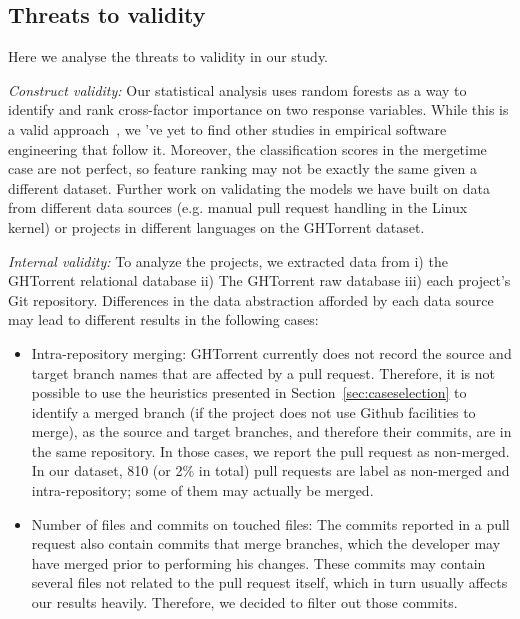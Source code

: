 \documentclass{sig-alternate}
\begin{document}
\subsection{Threats to validity}
Here we analyse the threats to validity in our study.

\noindent\emph{Construct validity:} Our statistical analysis uses random forests as a
way to identify and rank cross-factor importance on two response variables.
While this is a valid approach~\cite{}, we 've yet to find other studies in
empirical software engineering that follow it. Moreover, the classification
scores in the \textsf{mergetime} case are not perfect, so feature ranking may
not be exactly the same given a different dataset. Further work on validating
the models we have built on data from different data sources (e.g. manual pull
request handling in the Linux kernel) or projects in different languages on the
GHTorrent dataset.

\noindent\emph{Internal validity:}
To analyze the projects, we extracted data from i) the GHTorrent relational
database ii) The GHTorrent raw database iii) each project's Git repository.
Differences in the data abstraction afforded by each data source may
lead to different results in the following cases: 

\begin{itemize}

  \item Intra-repository merging: GHTorrent currently does not record the source
    and target branch names that are affected by a pull request. Therefore, it
    is not possible to use the heuristics presented in
    Section~\ref{sec:caseselection} to identify a merged branch (if the project
    does not use Github facilities to merge), as the source and target branches,
    and therefore their commits, are in the same repository. In those cases, we
    report the pull request as non-merged. In our dataset, 810 (or 2\% in total)
    pull requests are label as non-merged and intra-repository; some of them may
    actually be merged.

  \item Number of files and commits on touched files: The commits reported
    in a pull request also contain commits that merge branches, which the
    developer may have merged prior to performing his changes. These commits
    may contain several files not related to the pull request itself, which
    in turn usually affects our results heavily. Therefore, we decided to 
    filter out those commits.

\end{itemize}
\end{document}
